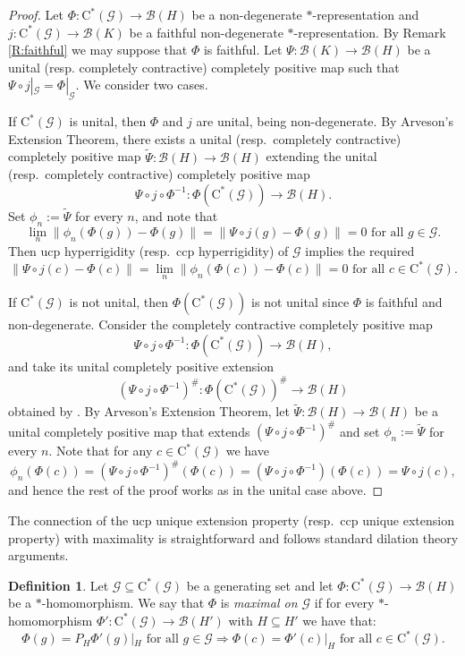 \documentclass[11pt, draft]{amsart}
\numberwithin{equation}{section}
\theoremstyle{plain}
\theoremstyle{definition}
\newtheorem{definition}[theorem]{Definition}
\theoremstyle{remark}
\newcommand{\B}{{\mathcal{B}}}
\newcommand{\G}{{\mathcal{G}}}
\newcommand{\foral}{\text{ for all }}
\newcommand{\ca}{\mathrm{C}^*}
\newcommand{\wt}{\widetilde}
\begin{document}
\begin{proof}
Let $\Phi \colon \ca(\G)\to \B(H)$ be a non-degenerate $*$-representation and $j\colon \ca(\G) \to \B(K)$ be a faithful non-degenerate $*$-representation.
By Remark \ref{R:faithful} we may suppose that $\Phi$ is faithful. 
Let $\Psi\colon \B(K)\to \B(H)$ be a unital (resp. completely contractive) completely positive map such that $\Psi\circ j|_{\G} = \Phi|_{\G}$. 
We consider two cases.

\smallskip

If $\ca(\G)$ is unital, then $\Phi$ and $j$ are unital, being non-degenerate. 
By Arveson's Extension Theorem, there exists a unital (resp.\ completely contractive) completely positive map $\wt{\Psi}\colon \B(H)\to \B(H)$ extending the unital (resp.\ completely contractive) completely positive map 
\[
\Psi\circ j\circ \Phi^{-1} \colon \Phi(\ca(\G)) \to \B(H).
\]
Set $\phi_n:=\wt{\Psi}$ for every $n$, and note that 
\[
\lim_n \|\phi_n(\Phi(g)) - \Phi(g)\|=\|\Psi\circ j(g)-\Phi(g)\| = 0\foral g\in \G.
\]
Then ucp hyperrigidity (resp.\ ccp hyperrigidity) of $\G$ implies the required
\[
\|\Psi\circ j(c)-\Phi(c)\|=\lim_n \|\phi_n(\Phi(c)) - \Phi(c)\| = 0\foral c\in\ca(\G).
\]

\smallskip

If $\ca(\G)$ is not unital, then $\Phi(\ca(\G))$ is not unital since $\Phi$ is faithful and non-degenerate.
Consider the completely contractive completely positive map 
\[
\Psi\circ j\circ \Phi^{-1} \colon \Phi(\ca(\G)) \to \B(H),
\] 
and take its unital completely positive extension 
\[
(\Psi \circ j \circ \Phi^{-1})^\#\colon \Phi(\ca(\G))^\# \to \B(H)
\]
obtained by \cite[Proposition 2.2.1]{BO08}.
By Arveson's Extension Theorem, let $\wt{\Psi} \colon \B(H) \to \B(H)$ be a unital completely positive map that extends $(\Psi \circ j \circ \Phi^{-1})^\#$ and set $\phi_n:=\wt{\Psi}$ for every $n$. 
Note that for any $c\in\ca(\G)$ we have
\[
\phi_n(\Phi(c))
= (\Psi \circ j \circ \Phi^{-1})^\#(\Phi(c))
= (\Psi \circ j \circ \Phi^{-1})(\Phi(c))
= \Psi\circ j(c),
\]
and hence the rest of the proof works as in the unital case above.
\end{proof}

The connection of the ucp unique extension property (resp.\ ccp unique extension property) with maximality is straightforward and follows standard dilation theory arguments.

\begin{definition} \label{D:max}
Let $\G\subseteq \ca(\G)$ be a generating set and let $\Phi\colon \ca(\G)\to \B(H)$ be a $*$-homomor\-phism. 
We say that $\Phi$ is \emph{maximal on $\G$} if for every $*$-homomorphism $\Phi'\colon \ca(\G)\to \B(H')$ with $H \subseteq H'$ we have that:
\[
\Phi(g) = P_H \Phi'(g) |_H \foral g \in \G
\Longrightarrow
\Phi(c) = \Phi'(c) |_H \foral c \in \ca(\G).
\]
\end{definition}
\end{document}
